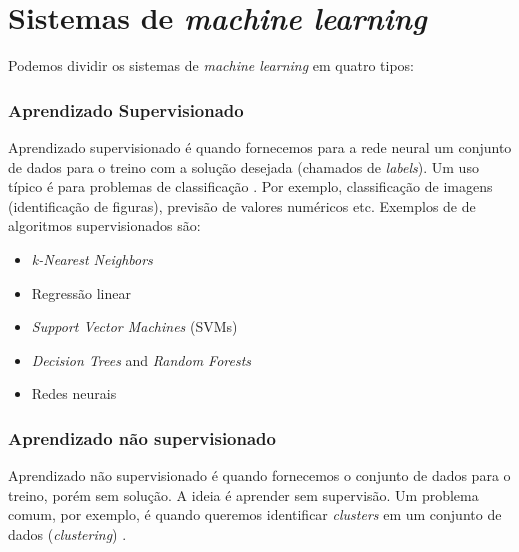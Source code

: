 \documentclass[a4paper,12pt,oneside]{book}
\begin{document}
\section{Sistemas de \textit{machine learning}}

Podemos dividir os sistemas de \textit{machine learning} em quatro tipos:

\subsubsection*{Aprendizado Supervisionado}

\par Aprendizado supervisionado é quando fornecemos para a rede neural um conjunto de dados para o treino com a solução desejada (chamados de \textit{labels}). Um uso típico é para problemas de classificação \cite{mlbook}. Por exemplo, classificação de imagens (identificação de figuras), previsão de valores numéricos etc. Exemplos de de algoritmos supervisionados são:

\begin{itemize}
    \item \textit{k-Nearest Neighbors} \cite{knn}
    \item Regressão linear
    \item \textit{Support Vector Machines} (SVMs)
    \item \textit{Decision Trees} and \textit{Random Forests}
    \item Redes neurais
\end{itemize}

\subsubsection*{Aprendizado não supervisionado}

\par Aprendizado não supervisionado é quando fornecemos o conjunto de dados para o treino, porém sem solução. A ideia é aprender sem supervisão. Um problema comum, por exemplo, é quando queremos identificar \textit{clusters} em um conjunto de dados (\textit{clustering})  \cite{unsupervised, knn_uns}.
\end{document}
